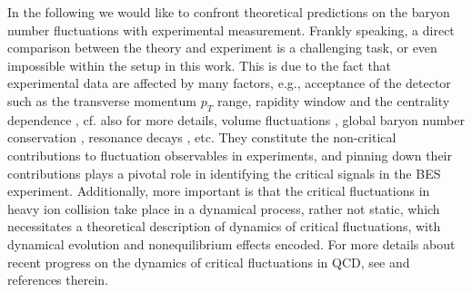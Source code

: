 \documentclass[%
reprint,
superscriptaddress,
showpacs,preprintnumbers,
 amsmath,amssymb,
 aps,
prd,
]{revtex4-1}
\begin{document}
In the following we would like to confront theoretical predictions on the baryon number fluctuations with experimental measurement. Frankly speaking, a direct comparison between the theory and experiment is a challenging task, or even impossible within the setup in this work. This is due to the fact that experimental data are affected by many factors, e.g.,  acceptance of the detector such as the transverse momentum $p_T$ range, rapidity window and the centrality dependence \cite{Adamczyk:2013dal,Luo:2015ewa,Adam:2020unf,Nonaka:2020crv,Pandav:2020uzx}, cf. also \cite{Luo:2017faz,Adamczyk:2017iwn} for more details, volume fluctuations \cite{Luo:2013bmi}, global baryon number conservation \cite{Braun-Munzinger:2016yjz,Vovchenko:2020tsr}, resonance decays \cite{Nahrgang:2014fza}, etc. They constitute the non-critical contributions to fluctuation observables in experiments, and pinning down their contributions plays a pivotal role in identifying the critical signals in the BES experiment. Additionally, more important is that the critical fluctuations in heavy ion collision take place in a dynamical process, rather not static, which necessitates a theoretical description of dynamics of critical fluctuations, with dynamical evolution and nonequilibrium effects encoded. For more details about recent progress on the dynamics of critical fluctuations in QCD, see \cite{Bluhm:2020mpc} and references therein. 
\end{document}
